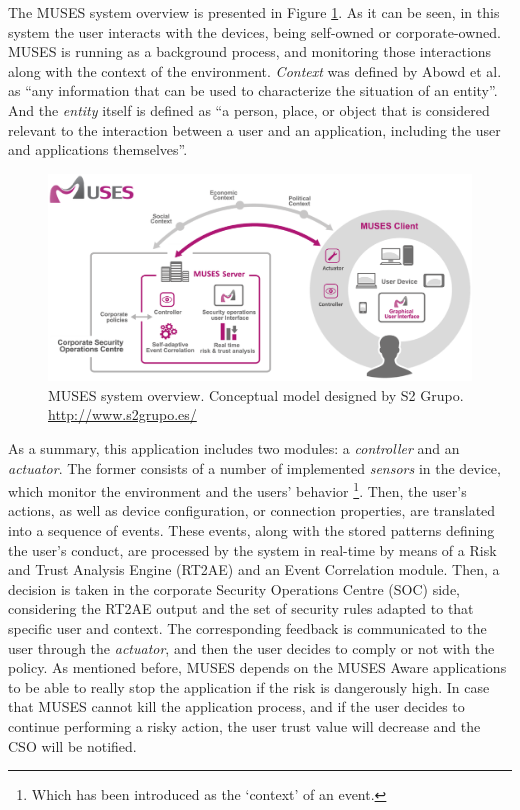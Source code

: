 \label{chap:appendixmuses}
\minitoc\mtcskip
\vfill

The MUSES system overview is presented in Figure \ref{fig:system_overview}. As it can be seen, in this system the user interacts with the devices, being self-owned or corporate-owned. MUSES is running as a background process, and monitoring those interactions along with the context of the environment. \textit{Context} was defined by Abowd et al. \cite{abowd1999towards} as ``any information that can be used to characterize the situation of an entity''. And the \textit{entity} itself is defined as ``a person, place, or object that is considered relevant to the interaction between a user and an application, including the user and applications
themselves''.

\begin{figure}
\centering
 \includegraphics[scale =0.17] {gfx/byodSotA/system_overview.eps}
\caption{MUSES system overview. Conceptual model designed by S2 Grupo.  \url{http://www.s2grupo.es/}}
\label{fig:system_overview}
\end{figure}

As a summary, this application includes two modules: a \textit{controller} and an \textit{actuator}. The former consists of a number of implemented \textit{sensors} in the device, which monitor the environment and the users' behavior \footnote{Which has been introduced as the `context' of an event.}. Then, the user's actions, as well as device configuration, or connection properties, are translated into a sequence of events. These events, along with the stored patterns defining the user's conduct, are processed by the system in real-time by means of a Risk and Trust Analysis Engine (RT2AE) and an Event Correlation module. Then, a decision is taken in the corporate Security Operations Centre (SOC) side, considering the RT2AE output and the set of security rules adapted to that specific user and context. The corresponding feedback is communicated to the user through the \textit{actuator}, and then the user decides to comply or not with the policy. As mentioned before, MUSES depends on the MUSES Aware applications to be able to really stop the application if the risk is dangerously high. In case that MUSES cannot kill the application process, and if the user decides to continue performing a risky action, the user trust value will decrease and the CSO will be notified.

